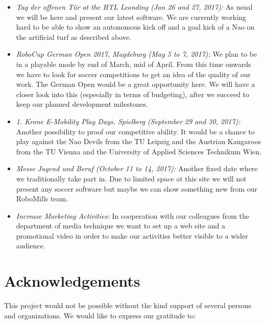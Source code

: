 \documentclass[11pt]{article}
\begin{document}
\begin{itemize}
	\item {\em Tag der offenen Tür at the HTL Leonding (Jan 26 and 27, 2017):} As usual we will be here and present our latest software. We are currently working hard to be able to show an autonomous kick off and a goal kick of a Nao on the artificial turf as described above.
	
	\item {\em RoboCup German Open 2017, Magdeburg (May 5 to 7, 2017):} We plan to be in a playable mode by end of March, mid of April. From this time onwards we have to look for soccer competitions to get an idea of the quality of our work. The German Open would be a great opportunity here. We will have a closer look into this (especially in terms of budgeting), after we succeed to keep our planned development milestones.
	
	\item {\em 1. Krone E-Mobility Play Days, Spielberg (September 29 and 30, 2017):} Another possibility to proof our competitive ability. It would be a chance to play against the Nao Devils from the TU Leipzig and the Austrian Kangaroos from the TU Vienna and the University of Applied Sciences Technikum Wien.
	
	\item {\em Messe Jugend und Beruf (October 11 to 14, 2017):} Another fixed date where we traditionally take part in. Due to limited space at this site we will not present any soccer software but maybe we can show something new from our RoboMills team.
	
	\item {\em Increase Marketing Activities:} In cooperation with our colleagues from the department of media technique we want to set up a web site and a promotional video in order to make our activities better visible to a wider audience.
\end{itemize}

\section{Acknowledgements}
This project would not be possible without the kind support of several persons and organizations. We would like to express our gratitude to:
\end{document}
